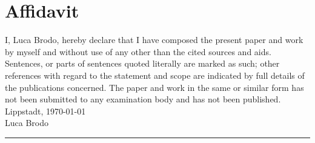 

\usepackage{natbib}

\newcommand*{\mytitle}{Analysing the Characteristics of Neural Networks for the Recognition of Sugar Beets} %
\newcommand*{\myinstitute}{Applied University of Hamm-Lippstadt} %


\newcommand*{\myauthor}{Luca Brodo} %
\newcommand*{\myreporttype}{Bachelor thesis} %
\newcommand*{\mygraduation}{Bachelor of Engineering} %



\newcommand*{\firstexaminer}{Prof. Dr. Stefan Henkler} %
\newcommand*{\secondexaminer}{Dipl.-Ing. Kristian Rother} %
\newcommand*{\mydate}{\today} %





\pagestyle{empty}

\newpage 					%
\thispagestyle{empty}
\quad 
\vfil
\hfil \textit{ } \hfil
\vfil 
 

\cleardoubleoddpage



\chapter*{Affidavit}
I, \myauthor, hereby declare that I have composed the present paper and work by myself and without use of any other than the cited sources and aids. Sentences, or parts of sentences quoted literally are marked as such; other references with regard to the statement and scope are indicated by full details of the publications concerned. The paper and work in the same or similar form has not been submitted to any examination body and has not been published. \\
Lippstadt, \today\\[.6cm]
\myauthor\\
\hfil
\rule[0.5em]{20em}{0.5pt}


\renewcommand*\listfigurename{List of Figures}
\renewcommand*\contentsname{Table of Content}
\renewcommand*\listtablename{List of Tables}

\newcommand\gw{8}
\newcommand\gws{8}


